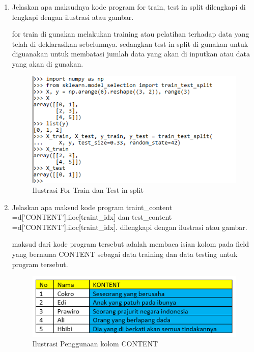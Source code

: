 \begin{enumerate}
\item Jelaskan apa maksudnya kode program for train, test in split dilengkapi di lengkapi dengan ilustrasi atau gambar.\par
for train di gunakan melakukan training atau pelatihan terhadap data yang telah di deklarasikan sebelumnya. 
sedangkan test in split di gunakan untuk diguanakan untuk membatasi jumlah data yang akan di inputkan atau data yang akan di gunakan.
\begin{figure}[ht]
\centering
\includegraphics[scale=0.4]{figures/1174012/chapter7/1,3.PNG}
\caption{Ilustrasi For Train dan Test in split}
\label{Contoh}
\end{figure}


\item Jelaskan apa maksud kode program traint\_content =d['CONTENT'].iloc[traint\_idx] dan test\_content =d['CONTENT'].iloc[traint\_idx]. dilengkapi dengan ilustrasi atau gambar.\par
maksud dari kode program tersebut adalah membaca isian kolom pada field yang bernama CONTENT sebagai data training dan data testing untuk program tersebut.
\begin{figure}[ht]
\centering
\includegraphics[scale=0.4]{figures/1174012/chapter7/1,4.PNG}
\caption{Ilustrasi Penggunaan kolom CONTENT}
\label{Contoh}
\end{figure}



\end{enumerate}
